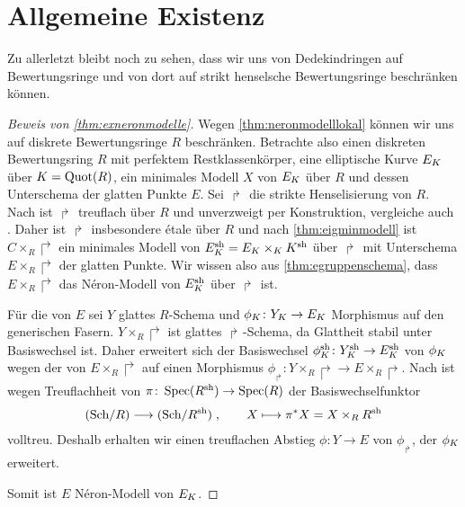 \section{Allgemeine Existenz}\label{chap:exneronmodellebeweis}
Zu allerletzt bleibt noch zu sehen, dass wir uns von Dedekindringen
auf Bewertungsringe und von dort auf strikt henselsche Bewertungsringe
beschränken können.
\begin{proof}[Beweis von \ref{thm:exneronmodelle}]
  Wegen \ref{thm:neronmodelllokal} können wir uns auf
  diskrete Bewertungsringe $R$ beschränken.
  Betrachte also einen diskreten Bewertungsring $R$ mit perfektem
  Restklassenkörper, eine elliptische Kurve $E_{K}$ über $K=\operatorname{Quot}(R)$,
  ein minimales Modell $X$ von $E_{K}$ über $R$ und dessen Unterschema
  der glatten Punkte $E$.
  Sei $\Rsh$ die strikte Henselisierung von $R$.
  Nach \cite[Chapter 2.4, Corollary 9]{neron} ist $\Rsh$ treuflach
  über $R$ und unverzweigt per Konstruktion, vergleiche auch
  \cite[Chapter 2.3, Proposition 11]{neron}.
  Daher ist $\Rsh$ insbesondere étale über $R$ und nach
  \ref{thm:eigminmodell} ist $C\times_R\Rsh$ ein minimales Modell von
  $E_\Ksh=E_\K\times_\K\Ksh$ über $\Rsh$ mit Unterschema
  $E\times_R\Rsh$ der glatten Punkte.
  Wir wissen also aus \ref{thm:egruppenschema}, dass $E\times_R\Rsh$
  das Néron-Modell von $E_\Ksh$ über $\Rsh$ ist.

  Für die \NAbbEig von $E$ sei $Y$ glattes $R$-Schema und
  $\phi_{K}\colon Y_{K}\to E_{K}$ Morphismus auf den generischen Fasern.
  $Y\times_R\Rsh$ ist glattes $\Rsh$-Schema, da Glattheit stabil unter
  Basiswechsel ist. Daher erweitert sich der Basiswechsel
  $\phi_\Ksh\colon Y_\Ksh\to E_\Ksh$ von $\phi_{K}$ wegen der \NAbbEig
  von $E\times_R\Rsh$ auf einen Morphismus $\phi_\Rsh\colon
  Y\times_R\Rsh\to E\times_R\Rsh$.
  Nach \cite[Chapter 6.1, Theorem 6]{neron} ist wegen Treuflachheit
  von $\pi\colon\operatorname{Spec}(R^{\text{sh}})\to\operatorname{Spec}(R)$ der Basiswechselfunktor
  \begin{gather*}
    \text{(Sch/$R$)}\longrightarrow\text{(Sch/$R^{\text{sh}}$)}\;,
    \qquad
    X\longmapsto \pi^*X=X\times_RR^{\text{sh}}
  \end{gather*}
  volltreu. Deshalb erhalten wir einen
  treuflachen Abstieg $\phi\colon Y\to E$ von $\phi_\Rsh$, der
  $\phi_{K}$ erweitert.

  Somit ist $E$ Néron-Modell von $E_{K}$.
\end{proof}

